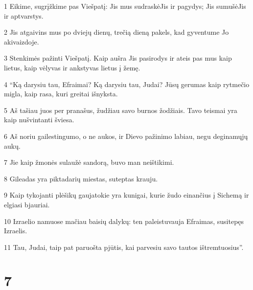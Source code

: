 \par 1 Eikime, sugrįžkime pas Viešpatį: Jis mus sudraskė­Jis ir pagydys; Jis sumušė­Jis ir aptvarstys. 
\par 2 Jis atgaivins mus po dviejų dienų, trečią dieną pakels, kad gyventume Jo akivaizdoje. 
\par 3 Stenkimės pažinti Viešpatį. Kaip aušra Jis pasirodys ir ateis pas mus kaip lietus, kaip vėlyvas ir ankstyvas lietus į žemę. 
\par 4 “Ką darysiu tau, Efraimai? Ką darysiu tau, Judai? Jūsų gerumas kaip rytmečio migla, kaip rasa, kuri greitai išnyksta. 
\par 5 Aš tašiau juos per pranašus, žudžiau savo burnos žodžiais. Tavo teismai yra kaip nušvintanti šviesa. 
\par 6 Aš noriu gailestingumo, o ne aukos, ir Dievo pažinimo labiau, negu deginamųjų aukų. 
\par 7 Jie kaip žmonės sulaužė sandorą, buvo man neištikimi. 
\par 8 Gileadas yra piktadarių miestas, suteptas krauju. 
\par 9 Kaip tykojanti plėšikų gauja­tokie yra kunigai, kurie žudo einančius į Sichemą ir elgiasi bjauriai. 
\par 10 Izraelio namuose mačiau baisių dalykų: ten paleistuvauja Efraimas, susitepęs Izraelis. 
\par 11 Tau, Judai, taip pat paruošta pjūtis, kai parvesiu savo tautos ištremtuosius”.



\chapter{7}


